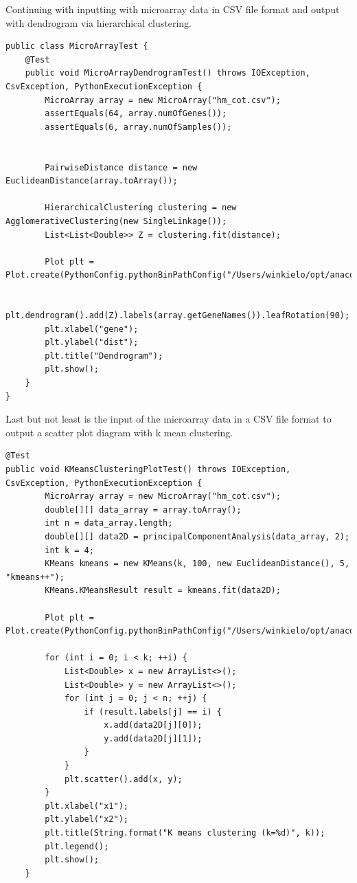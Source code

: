 \documentclass[]{final_report}
\begin{document}
Continuing with inputting with microarray data in CSV file format and output with dendrogram via hierarchical clustering. 
\begin{verbatim}
public class MicroArrayTest {
    @Test
    public void MicroArrayDendrogramTest() throws IOException, CsvException, PythonExecutionException {
        MicroArray array = new MicroArray("hm_cot.csv");
        assertEquals(64, array.numOfGenes());
        assertEquals(6, array.numOfSamples());


        PairwiseDistance distance = new EuclideanDistance(array.toArray());

        HierarchicalClustering clustering = new AgglomerativeClustering(new SingleLinkage());
        List<List<Double>> Z = clustering.fit(distance);

        Plot plt = Plot.create(PythonConfig.pythonBinPathConfig("/Users/winkielo/opt/anaconda3/bin/python"));

        plt.dendrogram().add(Z).labels(array.getGeneNames()).leafRotation(90);
        plt.xlabel("gene");
        plt.ylabel("dist");
        plt.title("Dendrogram");
        plt.show();
    }
}
\end{verbatim}

Last but not least is the input of the microarray data in a CSV file format to output a scatter plot diagram with k mean clustering.

\begin{verbatim}
@Test
public void KMeansClusteringPlotTest() throws IOException, CsvException, PythonExecutionException {
        MicroArray array = new MicroArray("hm_cot.csv");
        double[][] data_array = array.toArray();
        int n = data_array.length;
        double[][] data2D = principalComponentAnalysis(data_array, 2);
        int k = 4;
        KMeans kmeans = new KMeans(k, 100, new EuclideanDistance(), 5, "kmeans++");
        KMeans.KMeansResult result = kmeans.fit(data2D);

        Plot plt = Plot.create(PythonConfig.pythonBinPathConfig("/Users/winkielo/opt/anaconda3/bin/python"));

        for (int i = 0; i < k; ++i) {
            List<Double> x = new ArrayList<>();
            List<Double> y = new ArrayList<>();
            for (int j = 0; j < n; ++j) {
                if (result.labels[j] == i) {
                    x.add(data2D[j][0]);
                    y.add(data2D[j][1]);
                }
            }
            plt.scatter().add(x, y);
        }
        plt.xlabel("x1");
        plt.ylabel("x2");
        plt.title(String.format("K means clustering (k=%d)", k));
        plt.legend();
        plt.show();
    }
\end{verbatim}


 


\label{endpage}
\end{document}
